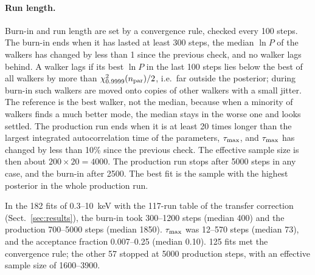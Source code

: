 \paragraph{Run length.}
Burn-in and run length are set by a convergence rule, checked every 100 steps.
The burn-in ends when it has lasted at least 300 steps, the median $\ln P$ of the walkers has changed by less than 1 since the previous check, and no walker lags behind.
A walker lags if its best $\ln P$ in the last 100 steps lies below the best of all walkers by more than $\chi^2_{0.9999}(n_{\rm par})/2$, i.e.\ far outside the posterior; during burn-in such walkers are moved onto copies of other walkers with a small jitter.
The reference is the best walker, not the median, because when a minority of walkers finds a much better mode, the median stays in the worse one and looks settled.
The production run ends when it is at least 20 times longer than the largest integrated autocorrelation time of the parameters, $\tau_{\rm max}$, and $\tau_{\rm max}$ has changed by less than 10\% since the previous check.
The effective sample size is then about $200 \times 20 = 4000$.
The production run stops after 5000 steps in any case, and the burn-in after 2500.
The best fit is the sample with the highest posterior in the whole production run.

In the 182 fits of 0.3--10~keV with the 117-run table of the transfer correction (Sect.~\ref{sec:results}), the burn-in took 300--1200 steps (median 400) and the production 700--5000 steps (median 1850).
$\tau_{\rm max}$ was 12--570 steps (median 73), and the acceptance fraction 0.007--0.25 (median 0.10).
125 fits met the convergence rule; the other 57 stopped at 5000 production steps, with an effective sample size of 1600--3900.
